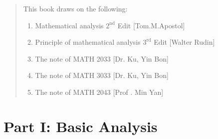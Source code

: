 \documentclass[
	UTF-8,
	11pt, %
	a4paper, %
]{LegrandOrangeBook}
\begin{document}
\begin{quote}
    This book draws on the following:
    \begin{enumerate}
        \item Mathematical analysis $2^{\text{nd}}$ Edit  [Tom.M.Apostol]
        \item Principle of mathematical analysis $3^\text{{rd}}$ Edit [Walter Rudin]
        \item The note of MATH 2033 [Dr. Ku, Yin Bon]
        \item The note of MATH 3033 [Dr. Ku, Yin Bon]
        \item The note of MATH 2043 [Prof . Min Yan]
    \end{enumerate}

\end{quote}





\pagestyle{empty} %

\tableofcontents %



\pagestyle{fancy} %

\cleardoublepage %


\part{Part I: Basic Analysis }


\chapterspaceabove{6.75cm} %
\chapterspacebelow{7.25cm} %
\end{document}
